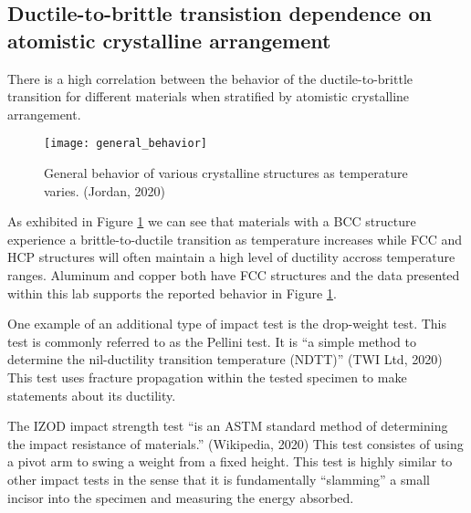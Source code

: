 \documentclass{article}
\begin{document}
\subsection{Ductile-to-brittle transistion dependence on atomistic crystalline arrangement}

There is a high correlation between the behavior of the ductile-to-brittle transition for different materials when stratified by atomistic crystalline arrangement.

\begin{figure}[H]
\centering
\texttt{[image: general\_behavior]}
\caption{General behavior of various crystalline structures as temperature varies. (Jordan, 2020)}
\label{fig:generalBehavior}
\end{figure}

As exhibited in Figure \ref{fig:generalBehavior} we can see that materials with a BCC structure experience a brittle-to-ductile transition as temperature increases while FCC and HCP structures will often maintain a high level of ductility accross temperature ranges. Aluminum and copper both have FCC structures and the data presented within this lab supports the reported behavior in Figure \ref{fig:generalBehavior}.

One example of an additional type of impact test is the drop-weight test. This test is commonly referred to as the Pellini test. It is ``a simple method to determine the nil-ductility transition temperature (NDTT)'' (TWI Ltd, 2020) This test uses fracture propagation within the tested specimen to make statements about its ductility.

The IZOD impact strength test ``is an ASTM standard method of determining the impact resistance of materials.'' (Wikipedia, 2020) This test consistes of using a pivot arm to swing a weight from a fixed height. This test is highly similar to other impact tests in the sense that it is fundamentally ``slamming'' a small incisor into the specimen and measuring the energy absorbed.
\end{document}
